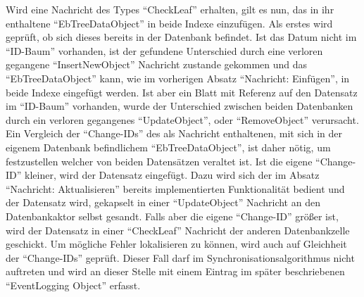 \documentclass[a4paper,11pt,oneside,%
headsepline,												%
footsepline,												%
bibtotocnumbered									%
]{scrreprt}
\begin{document}
Wird eine Nachricht des Types \enquote{CheckLeaf} erhalten, gilt es nun, das in ihr enthaltene \enquote{EbTreeDataObject} in beide Indexe einzufügen. Als erstes wird geprüft, ob sich dieses bereits in der Datenbank befindet. Ist das Datum nicht im \enquote{ID-Baum} vorhanden, ist der gefundene Unterschied durch eine verloren gegangene \enquote{InsertNewObject} Nachricht zustande gekommen und das \enquote{EbTreeDataObject} kann, wie im vorherigen Absatz \enquote{Nachricht: Einfügen}, in beide Indexe eingefügt werden.
Ist aber ein Blatt mit Referenz auf den Datensatz im \enquote{ID-Baum} vorhanden, wurde der Unterschied zwischen beiden Datenbanken durch ein verloren gegangenes \enquote{UpdateObject}, oder \enquote{RemoveObject} verursacht. Ein Vergleich der \enquote{Change-IDs} des als Nachricht enthaltenen, mit sich in der eigenem Datenbank befindlichem \enquote{EbTreeDataObject}, ist daher nötig, um festzustellen welcher von beiden Datensätzen veraltet ist. Ist die eigene \enquote{Change-ID} kleiner, wird der Datensatz eingefügt. Dazu wird sich der im Absatz \enquote{Nachricht: Aktualisieren} bereits implementierten Funktionalität bedient und der Datensatz wird, gekapselt in einer \enquote{UpdateObject} Nachricht an den Datenbankaktor selbst gesandt. Falls aber die eigene \enquote{Change-ID} größer ist, wird der Datensatz in einer \enquote{CheckLeaf} Nachricht der anderen Datenbankzelle geschickt. Um mögliche Fehler lokalisieren zu können, wird auch auf Gleichheit der \enquote{Change-IDs} geprüft. Dieser Fall darf im Synchronisationsalgorithmus nicht auftreten und wird an dieser Stelle mit einem Eintrag im später beschriebenen \enquote{EventLogging Object} erfasst.
\end{document}
